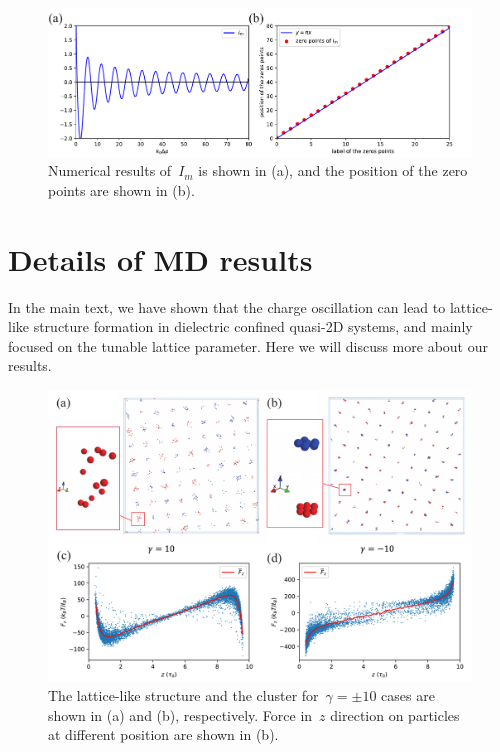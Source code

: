 \begin{figure}[htbp]
\centering
\includegraphics[width=  \linewidth]{figs/I_3.pdf}
\caption{
    Numerical results of~$I_{m}$ is shown in (a), and the position of the zero points are shown in (b).
}
\label{fig:I_3}
\end{figure}


\section{Details of MD results}

In the main text, we have shown that the charge oscillation can lead to lattice-like structure formation in dielectric confined quasi-2D systems, and mainly focused on the tunable lattice parameter.
Here we will discuss more about our results.

\begin{figure}[ht]
    \centering
    \includegraphics[width = \linewidth]{figs/MD_ball.pdf}
    \caption{The lattice-like structure and the cluster for~$\gamma = \pm 10$ cases are shown in (a) and (b), respectively. Force in~$z$ direction on particles at different position are shown in (b).}
    \label{fig:balls}
\end{figure}

